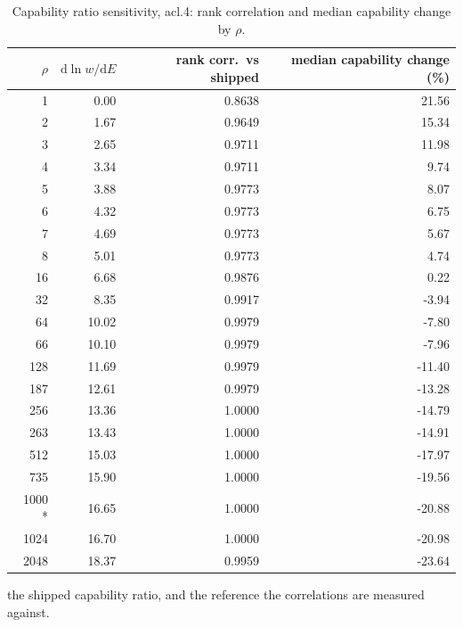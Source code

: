 \begin{table}[htbp]
  \centering
  \caption{Capability ratio sensitivity, acl.4: rank correlation and median capability change by $\rho$.}
  \label{tab:rho-acl-4-summary}
  \begin{tabular}{r r r r}
    \toprule
    $\rho$ & $\mathrm{d}\ln w/\mathrm{d}E$ & rank corr.\ vs shipped & median capability change (\%) \\
    \midrule
    1 & 0.00 & 0.8638 & 21.56 \\
    2 & 1.67 & 0.9649 & 15.34 \\
    3 & 2.65 & 0.9711 & 11.98 \\
    4 & 3.34 & 0.9711 & 9.74 \\
    5 & 3.88 & 0.9773 & 8.07 \\
    6 & 4.32 & 0.9773 & 6.75 \\
    7 & 4.69 & 0.9773 & 5.67 \\
    8 & 5.01 & 0.9773 & 4.74 \\
    16 & 6.68 & 0.9876 & 0.22 \\
    32 & 8.35 & 0.9917 & -3.94 \\
    64 & 10.02 & 0.9979 & -7.80 \\
    66 & 10.10 & 0.9979 & -7.96 \\
    128 & 11.69 & 0.9979 & -11.40 \\
    187 & 12.61 & 0.9979 & -13.28 \\
    256 & 13.36 & 1.0000 & -14.79 \\
    263 & 13.43 & 1.0000 & -14.91 \\
    512 & 15.03 & 1.0000 & -17.97 \\
    735 & 15.90 & 1.0000 & -19.56 \\
    1000 * & 16.65 & 1.0000 & -20.88 \\
    1024 & 16.70 & 1.0000 & -20.98 \\
    2048 & 18.37 & 0.9959 & -23.64 \\
    \bottomrule
  \end{tabular}
  \par\smallskip\footnotesize * the shipped capability ratio, and the reference the correlations are measured against.
\end{table}
